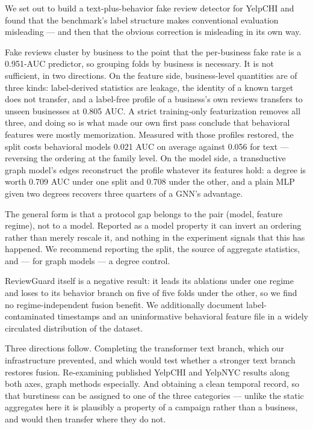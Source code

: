 \documentclass[conference]{IEEEtran}
\begin{document}
We set out to build a text-plus-behavior fake review detector for YelpCHI and
found that the benchmark's label structure makes conventional evaluation
misleading --- and then that the obvious correction is misleading in its own way.

Fake reviews cluster by business to the point that the per-business fake rate is
a 0.951-AUC predictor, so grouping folds by business is necessary. It is not
sufficient, in two directions. On the feature side, business-level quantities are
of three kinds: label-derived statistics are leakage, the identity of a known
target does not transfer, and a label-free profile of a business's own reviews
transfers to unseen businesses at 0.805 AUC. A strict training-only
featurization removes all three, and doing so is what made our own first pass
conclude that behavioral features were mostly memorization. Measured with those
profiles restored, the split costs behavioral models 0.021 AUC on average
against 0.056 for text --- reversing the ordering at the family level. On the
model side, a transductive graph model's edges reconstruct the profile whatever its features
hold: a degree is worth 0.709 AUC under one split and 0.708 under the other, and
a plain MLP given two degrees recovers three quarters of a GNN's advantage.

The general form is that a protocol gap belongs to the pair (model, feature
regime), not to a model. Reported as a model property it can invert an ordering
rather than merely rescale it, and nothing in the experiment signals that this
has happened. We recommend reporting the split, the source of aggregate
statistics, and --- for graph models --- a degree control.

ReviewGuard itself is a negative result: it leads its ablations under one regime
and loses to its behavior branch on five of five folds under the other, so we
find no regime-independent fusion benefit. We additionally document
label-contaminated timestamps and an uninformative behavioral feature file in a
widely circulated distribution of the dataset.

Three directions follow. Completing the transformer text branch, which our
infrastructure prevented, and which would test whether a stronger text branch
restores fusion. Re-examining published YelpCHI and YelpNYC results along both
axes, graph methods especially. And obtaining a clean temporal record, so that
burstiness can be assigned to one of the three categories --- unlike the static
aggregates here it is plausibly a property of a campaign rather than a business,
and would then transfer where they do not.
\end{document}
